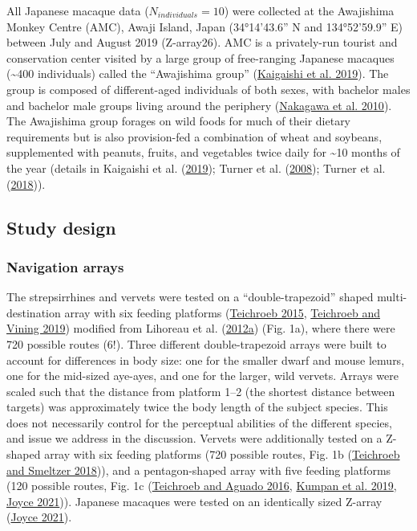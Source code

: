 \documentclass[twoside,12pt,final]{ucthesis-CA2012}
\begin{document}
\begin{ucmainmatter}
All Japanese macaque data (\(N_{individuals} = 10\)) were collected at the Awajishima Monkey Centre (AMC), Awaji Island, Japan (34°14'43.6'' N and 134°52'59.9'' E) between July and August 2019 (Z-array26). AMC is a privately-run tourist and conservation center visited by a large group of free-ranging Japanese macaques (\textasciitilde400 individuals) called the ``Awajishima group'' (\protect\hyperlink{ref-kaigaishi2019}{Kaigaishi et al. 2019}). The group is composed of different-aged individuals of both sexes, with bachelor males and bachelor male groups living around the periphery (\protect\hyperlink{ref-nakagawa2010}{Nakagawa et al. 2010}). The Awajishima group forages on wild foods for much of their dietary requirements but is also provision-fed a combination of wheat and soybeans, supplemented with peanuts, fruits, and vegetables twice daily for \textasciitilde10 months of the year (details in Kaigaishi et al. (\protect\hyperlink{ref-kaigaishi2019}{2019}); Turner et al. (\protect\hyperlink{ref-turner2008}{2008}); Turner et al. (\protect\hyperlink{ref-turner2018}{2018})).

\hypertarget{study-design}{%
\subsection{Study design}\label{study-design}}

\hypertarget{navigation-arrays}{%
\subsubsection{Navigation arrays}\label{navigation-arrays}}

The strepsirrhines and vervets were tested on a ``double-trapezoid'' shaped multi-destination array with six feeding platforms (\protect\hyperlink{ref-teichroeb2015}{Teichroeb 2015}, \protect\hyperlink{ref-teichroeb2019a}{Teichroeb and Vining 2019}) modified from Lihoreau et al. (\protect\hyperlink{ref-lihoreau2012b}{2012a}) (Fig. 1a), where there were 720 possible routes (6!). Three different double-trapezoid arrays were built to account for differences in body size: one for the smaller dwarf and mouse lemurs, one for the mid-sized aye-ayes, and one for the larger, wild vervets. Arrays were scaled such that the distance from platform 1--2 (the shortest distance between targets) was approximately twice the body length of the subject species. This does not necessarily control for the perceptual abilities of the different species, and issue we address in the discussion. Vervets were additionally tested on a Z-shaped array with six feeding platforms (720 possible routes, Fig. 1b (\protect\hyperlink{ref-teichroeb2018}{Teichroeb and Smeltzer 2018})), and a pentagon-shaped array with five feeding platforms (120 possible routes, Fig. 1c (\protect\hyperlink{ref-teichroeb2016}{Teichroeb and Aguado 2016}, \protect\hyperlink{ref-kumpan2019}{Kumpan et al. 2019}, \protect\hyperlink{ref-joyce2021}{Joyce 2021})). Japanese macaques were tested on an identically sized Z-array (\protect\hyperlink{ref-joyce2021}{Joyce 2021}).



\end{ucmainmatter}
\end{document}
